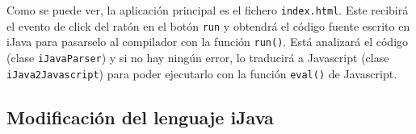 Como se puede ver, la aplicación principal es el fichero \texttt{index.html}. Este recibirá el evento de click del ratón en el botón \texttt{run} y obtendrá el código fuente escrito en iJava para pasarselo al compilador con la función \texttt{run()}. Está analizará el código (clase \texttt{iJavaParser}) y si no hay ningún error, lo traducirá a Javascript (clase \texttt{iJava2Javascript}) para poder ejecutarlo con la función \texttt{eval()} de Javascript.


\subsection{Modificación del lenguaje iJava}
\label{sec:modificacion-ijava}


